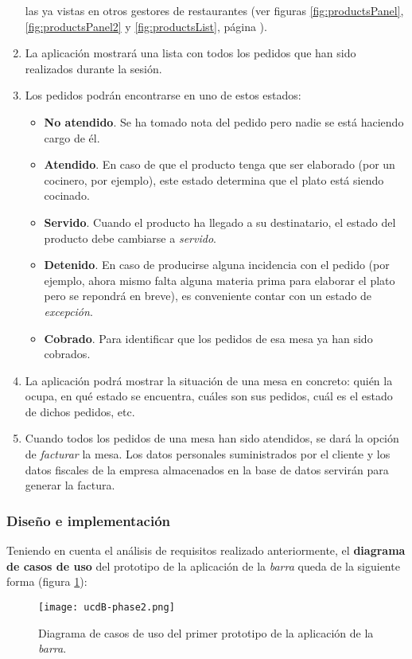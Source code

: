 \begin{enumerate}
las ya vistas en otros gestores de restaurantes (ver figuras
\ref{fig:productsPanel}, \ref{fig:productsPanel2} y \ref{fig:productsList},
página \pageref{fig:productsPanel}).
\item La aplicación mostrará una lista con todos los pedidos que han sido
realizados durante la sesión.
\item Los pedidos podrán encontrarse en uno de estos estados:
  \begin{itemize}
  \item \textbf{No atendido}. Se ha tomado nota del pedido pero nadie se está
  haciendo cargo de él.
  \item \textbf{Atendido}. En caso de que el producto tenga que ser elaborado
  (por un cocinero, por ejemplo), este estado determina que el plato está
  siendo cocinado.
  \item \textbf{Servido}. Cuando el producto ha llegado a su destinatario, el
  estado del producto debe cambiarse a \emph{servido}.
  \item \textbf{Detenido}. En caso de producirse alguna incidencia con el
  pedido (por ejemplo, ahora mismo falta alguna materia prima para elaborar
  el plato pero se repondrá en breve), es conveniente contar con un estado
  de \emph{excepción}.
  \item \textbf{Cobrado}. Para identificar que los pedidos de esa mesa ya han
  sido cobrados.
  \end{itemize}
\item La aplicación podrá mostrar la situación de una mesa en concreto: quién
la ocupa, en qué estado se encuentra, cuáles son sus pedidos, cuál es el
estado de dichos pedidos, etc.
\item Cuando todos los pedidos de una mesa han sido atendidos, se dará la
opción de \emph{facturar} la mesa. Los datos personales suministrados por el
cliente y los datos fiscales de la empresa almacenados en la base de datos
servirán para generar la factura.
\end{enumerate}

\subsubsection{Diseño e implementación}
Teniendo en cuenta el análisis de requisitos realizado anteriormente, el
\textbf{diagrama de casos de uso} del prototipo de la aplicación de la
\emph{barra} queda de la siguiente forma (figura \ref{fig:ucdB-phase2}):

  \begin{figure}[!h]
    \begin{center}
      \texttt{[image: ucdB-phase2.png]}
      \caption{Diagrama de casos de uso del primer prototipo de la aplicación
      de la \emph{barra}.}
      \label{fig:ucdB-phase2}
    \end{center}
  \end{figure}


